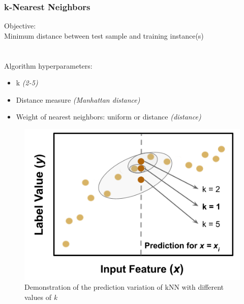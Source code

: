 \begin{frame}
  \frametitle{k-Nearest Neighbors}
  \begin{adjustwidth}{-10pt}{0pt}
  \begin{minipage}{0.5\textwidth}
    Objective: \\
    Minimum distance between test sample and training instance(s) \\
    \\~\\
    Algorithm hyperparameters:
    \begin{itemize}
      \item k \textit{(2-5)}
      \item Distance measure \textit{(Manhattan distance)}
      \item Weight of nearest neighbors: uniform or distance \textit{(distance)}
    \end{itemize}
  \end{minipage}%
  \hfill
  \begin{minipage}{0.5\textwidth}
    \begin{figure}
      \centering
      \includegraphics[height=0.5\textheight]{./figures/nn-fig.png}
      \caption{Demonstration of the prediction variation of kNN with different values of \textit{k}}
    \end{figure}
  \end{minipage}
  \end{adjustwidth}
\end{frame}

